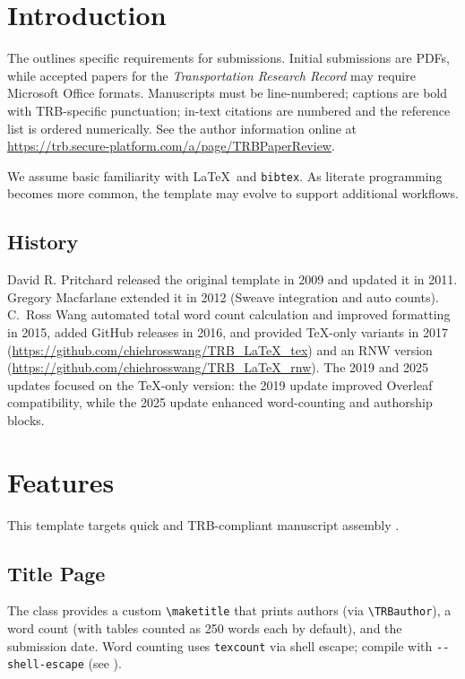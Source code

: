 \documentclass[numbered]{trbunofficial}
\begin{document}
\section{Introduction}\label{sec:intro}
The \citep{TRBGuide} outlines specific requirements for submissions. Initial submissions are PDFs, while accepted papers for the \textit{Transportation Research Record} may require Microsoft Office formats. Manuscripts must be line-numbered; captions are bold with TRB-specific punctuation; in-text citations are numbered and the reference list is ordered numerically. See the author information online at \url{https://trb.secure-platform.com/a/page/TRBPaperReview}.

We assume basic familiarity with \LaTeX\ and \verb|bibtex|. As literate programming becomes more common, the template may evolve to support additional workflows.


\subsection{History}
David R. Pritchard released the original template in 2009 and updated it in 2011. Gregory Macfarlane extended it in 2012 (Sweave integration and auto counts). C.\ Ross Wang automated total word count calculation and improved formatting in 2015, added GitHub releases in 2016, and provided \TeX-only variants in 2017 (\url{https://github.com/chiehrosswang/TRB_LaTeX_tex}) and an RNW version (\url{https://github.com/chiehrosswang/TRB_LaTeX_rnw}). The 2019 and 2025 updates focused on the \TeX-only version: the 2019 update improved Overleaf compatibility, while the 2025 update enhanced word-counting and authorship blocks.

\section{Features}
This template targets quick and TRB-compliant manuscript assembly \cite{trbwebsite}.

\subsection{Title Page}
The class provides a custom \verb|\maketitle| that prints authors (via \verb|\TRBauthor|), a word count (with tables counted as 250 words each by default), and the submission date. Word counting uses \verb|texcount| via shell escape; compile with \verb|--shell-escape| (see ).
\end{document}
